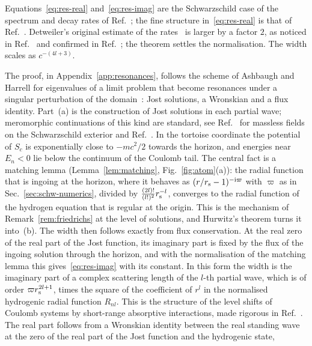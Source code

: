 \documentclass[%
 aip,
 jmp,
 amsmath,amssymb,
 reprint, onecolumn
]{revtex4-1}
\theoremstyle{definition}
\theoremstyle{remark}
\newcommand{\rmi}{\mathrm{i}}
\begin{document}
Equations~\eqref{eq:res-real} and~\eqref{eq:res-imag} are the
Schwarzschild case of the spectrum and decay rates of
Ref.~; the fine structure
in~\eqref{eq:res-real} is that of Ref.~.
Detweiler's original estimate of the rates~\cite{Detweiler1980} is larger
by a factor $2$, as noticed in
Ref.~ and confirmed in
Ref.~; the theorem settles the normalisation.
The width scales as $c^{-(4l+3)}$.

The proof, in Appendix~\ref{app:resonances}, follows the scheme of
Ashbaugh and Harrell for eigenvalues of a limit problem that become
resonances under a singular perturbation of the
domain~\cite{AshbaughHarrell1982}: Jost solutions, a Wronskian and a
flux identity. Part~(a) is the construction of Jost solutions in each
partial wave; meromorphic continuations of this kind are standard, see
Ref.~ for massless fields on the
Schwarzschild exterior and Ref.~. In the tortoise coordinate the potential of $S_c$ is
exponentially close to $-mc^2/2$ towards the horizon, and energies near
$E_n<0$ lie below the continuum of the Coulomb tail. The central fact is
a matching lemma (Lemma~\ref{lem:matching}, Fig.~\ref{fig:atom}(a)): the radial function that is
ingoing at the horizon, where it behaves as $(r/r_{\rm s}-1)^{-\rmi
\varpi}$ with $\varpi$ as in Sec.~\ref{sec:schw-numerics}, divided by $\frac{(2l)!}{(l!)^2}r_{\rm s}^{-l}$, converges to
the radial function of the hydrogen equation that is regular at the
origin. This is the mechanism of Remark~\ref{rem:friedrichs} at the level
of solutions, and Hurwitz's theorem turns it into~(b). The width then
follows exactly from flux conservation. At the real zero of the real
part of the Jost function, its imaginary part is fixed by the flux of
the ingoing solution through the horizon, and with the normalisation of the matching lemma
this gives~\eqref{eq:res-imag} with its constant. In this form the width
is the imaginary part of a complex scattering length of the $l$-th
partial wave, which is of order $\varpi r_{\rm s}^{2l+1}$, times the
square of the coefficient of $r^l$ in the normalised hydrogenic radial
function $R_{nl}$. This is the structure of the level shifts
of Coulomb systems by short-range absorptive interactions, made rigorous
in Ref.~. The real
part follows from a Wronskian identity between the real standing wave at
the zero of the real part of the Jost function and the hydrogenic state,
\end{document}
